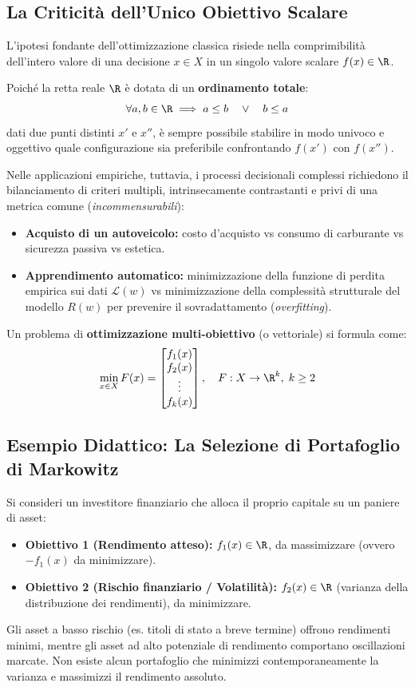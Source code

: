 \subsection{La Criticit\`a dell'Unico Obiettivo Scalare}
L'ipotesi fondante dell'ottimizzazione classica risiede nella comprimibilit\`a dell'intero valore di una decisione $x \in X$ in un singolo valore scalare $f(x) \in \R$. 

Poich\'e la retta reale $\R$ \`e dotata di un \textbf{ordinamento totale}:
\begin{equation}
\forall a, b \in \R \implies a \le b \quad \lor \quad b \le a
\end{equation}
dati due punti distinti $x'$ e $x''$, \`e sempre possibile stabilire in modo univoco e oggettivo quale configurazione sia preferibile confrontando $f(x')$ con $f(x'')$.

Nelle applicazioni empiriche, tuttavia, i processi decisionali complessi richiedono il bilanciamento di criteri multipli, intrinsecamente contrastanti e privi di una metrica comune (\textit{incommensurabili}):
\begin{itemize}
    \item \textbf{Acquisto di un autoveicolo:} costo d'acquisto vs consumo di carburante vs sicurezza passiva vs estetica.
    \item \textbf{Apprendimento automatico:} minimizzazione della funzione di perdita empirica sui dati $\mathcal{L}(w)$ vs minimizzazione della complessit\`a strutturale del modello $R(w)$ per prevenire il sovradattamento (\textit{overfitting}).
\end{itemize}

Un problema di \textbf{ottimizzazione multi-obiettivo} (o vettoriale) si formula come:
\begin{equation}
\min_{x \in X} F(x) = \begin{bmatrix} f_1(x) \\ f_2(x) \\ \vdots \\ f_k(x) \end{bmatrix}, \quad F: X \to \R^k, \; k \ge 2
\end{equation}

\subsection{Esempio Didattico: La Selezione di Portafoglio di Markowitz}
Si consideri un investitore finanziario che alloca il proprio capitale su un paniere di asset:
\begin{itemize}
    \item \textbf{Obiettivo 1 (Rendimento atteso):} $f_1(x) \in \R$, da massimizzare (ovvero $-f_1(x)$ da minimizzare).
    \item \textbf{Obiettivo 2 (Rischio finanziario / Volatilit\`a):} $f_2(x) \in \R$ (varianza della distribuzione dei rendimenti), da minimizzare.
\end{itemize}
Gli asset a basso rischio (es. titoli di stato a breve termine) offrono rendimenti minimi, mentre gli asset ad alto potenziale di rendimento comportano oscillazioni marcate. Non esiste alcun portafoglio che minimizzi contemporaneamente la varianza e massimizzi il rendimento assoluto.

